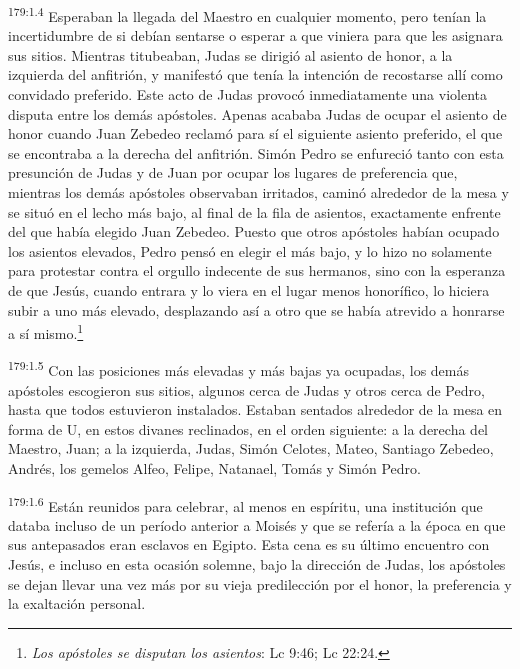 \par 
\textsuperscript{179:1.4} Esperaban la llegada del Maestro en cualquier momento, pero tenían la incertidumbre de si debían sentarse o esperar a que viniera para que les asignara sus sitios. Mientras titubeaban, Judas se dirigió al asiento de honor, a la izquierda del anfitrión, y manifestó que tenía la intención de recostarse allí como convidado preferido. Este acto de Judas provocó inmediatamente una violenta disputa entre los demás apóstoles. Apenas acababa Judas de ocupar el asiento de honor cuando Juan Zebedeo reclamó para sí el siguiente asiento preferido, el que se encontraba a la derecha del anfitrión. Simón Pedro se enfureció tanto con esta presunción de Judas y de Juan por ocupar los lugares de preferencia que, mientras los demás apóstoles observaban irritados, caminó alrededor de la mesa y se situó en el lecho más bajo, al final de la fila de asientos, exactamente enfrente del que había elegido Juan Zebedeo. Puesto que otros apóstoles habían ocupado los asientos elevados, Pedro pensó en elegir el más bajo, y lo hizo no solamente para protestar contra el orgullo indecente de sus hermanos, sino con la esperanza de que Jesús, cuando entrara y lo viera en el lugar menos honorífico, lo hiciera subir a uno más elevado, desplazando así a otro que se había atrevido a honrarse a sí mismo.\footnote{\textit{Los apóstoles se disputan los asientos}: Lc 9:46; Lc 22:24.}

\par 
\textsuperscript{179:1.5} Con las posiciones más elevadas y más bajas ya ocupadas, los demás apóstoles escogieron sus sitios, algunos cerca de Judas y otros cerca de Pedro, hasta que todos estuvieron instalados. Estaban sentados alrededor de la mesa en forma de U, en estos divanes reclinados, en el orden siguiente: a la derecha del Maestro, Juan; a la izquierda, Judas, Simón Celotes, Mateo, Santiago Zebedeo, Andrés, los gemelos Alfeo, Felipe, Natanael, Tomás y Simón Pedro.

\par 
\textsuperscript{179:1.6} Están reunidos para celebrar, al menos en espíritu, una institución que databa incluso de un período anterior a Moisés y que se refería a la época en que sus antepasados eran esclavos en Egipto. Esta cena es su último encuentro con Jesús, e incluso en esta ocasión solemne, bajo la dirección de Judas, los apóstoles se dejan llevar una vez más por su vieja predilección por el honor, la preferencia y la exaltación personal.

